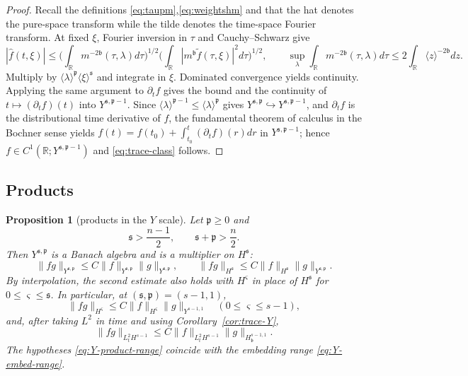 \documentclass[11pt,reqno]{amsart}
\theoremstyle{plain}
\newtheorem{proposition}[theorem]{Proposition}
\theoremstyle{definition}
\theoremstyle{remark}
\numberwithin{equation}{section}
\newcommand{\breg}{\mathfrak b}
\newcommand{\sreg}{\mathfrak s}
\newcommand{\preg}{\mathfrak p}
\newcommand{\Real}{\mathbb R}
\begin{document}
\begin{proof}
Recall the definitions \eqref{eq:taupm},\eqref{eq:weightshm} and that the hat denotes the pure-space transform while the tilde denotes the time-space Fourier transform. At fixed $\xi$, Fourier inversion in $\tau$ and Cauchy--Schwarz give
\[
 |\widehat f(t,\xi)|
 \le \Big(\int_{\Real} m^{-2\breg}(\tau,\lambda) d\tau\Big)^{1/2}
      \Big(\int_{\Real} |m^{\breg}\widetilde f(\tau,\xi)|^2 d\tau\Big)^{1/2},
 \qquad
 \sup_\lambda\int_{\Real} m^{-2\breg}(\tau,\lambda) d\tau
 \le2\int_{\Real}\langle z\rangle^{-2\breg} dz.
\]
Multiply by $\langle\lambda\rangle^{\preg}\langle\xi\rangle^{\sreg}$ and integrate in
$\xi$.  Dominated convergence yields continuity.  Applying the same argument to $\partial_tf$
gives the bound and the continuity of $t\mapsto(\partial_tf)(t)$ into
$Y^{\sreg,\preg-1}$.  Since $\langle\lambda\rangle^{\preg-1}\le
\langle\lambda\rangle^{\preg}$ gives $Y^{\sreg,\preg}\hookrightarrow
Y^{\sreg,\preg-1}$, and $\partial_tf$ is the distributional time derivative of
$f$, the fundamental theorem of calculus in the Bochner sense yields
$f(t)=f(t_0)+\int_{t_0}^{t}(\partial_tf)(r) dr$ in $Y^{\sreg,\preg-1}$; hence
$f\in C^1(\Real;Y^{\sreg,\preg-1})$ and \eqref{eq:trace-class} follows.
\end{proof}

\subsection{Products}

\begin{proposition}[products in the $Y$ scale]\label{prop:tame-product}
Let $\preg\ge0$ and
\begin{equation}\label{eq:Y-product-range}
 \sreg>\frac{n-1}{2},\qquad \sreg+\preg>\frac n2.
\end{equation}
Then $Y^{\sreg,\preg}$ is a Banach algebra and is a multiplier on $H^{\sreg}$:
\begin{equation}\label{eq:Y-product}
 \|fg\|_{Y^{\sreg,\preg}}\le C\|f\|_{Y^{\sreg,\preg}}\|g\|_{Y^{\sreg,\preg}},
 \qquad
 \|fg\|_{H^{\sreg}}\le C\|f\|_{H^{\sreg}}\|g\|_{Y^{\sreg,\preg}}.
\end{equation}
By interpolation, the second estimate also holds with $H^\varsigma$ in place of $H^{\sreg}$ for
$0\le\varsigma\le\sreg$.  In particular, at $(\sreg,\preg)=(s-1,1)$,
\begin{equation}\label{eq:tame-sp}
 \|fg\|_{H^\varsigma}\le C\|f\|_{H^\varsigma}\|g\|_{Y^{s-1,1}}
 \quad(0\le\varsigma\le s-1),
\end{equation}
and, after taking $L^2$ in time and using Corollary~\ref{cor:trace-Y},
\[
 \|fg\|_{L^2_tH^{s-1}}
 \le C\|f\|_{L^2_tH^{s-1}}\|g\|_{H^{s-1,1}_{\breg}}.
\]
The hypotheses \eqref{eq:Y-product-range} coincide with the embedding range
\eqref{eq:Y-embed-range}.
\end{proposition}
\end{document}
